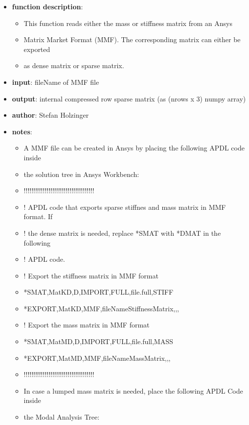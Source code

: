 \begin{itemize}[leftmargin=1.4cm]
\begin{itemize}[leftmargin=1.4cm]
\begin{itemize}[leftmargin=1.4cm]
\begin{itemize}[leftmargin=0.5cm]
\begin{itemize}[leftmargin=1.4cm]
\begin{itemize}[leftmargin=1.4cm]
\begin{itemize}[leftmargin=1.4cm]
\begin{itemize}[leftmargin=0.5cm]
\begin{itemize}[leftmargin=0.7cm]
\item[--]
{\bf function description}: \vspace{-6pt}
\begin{itemize}[leftmargin=1.2cm]
\setlength{\itemindent}{-0.7cm}
\item[]This function reads either the mass or stiffness matrix from an Ansys
\item[]Matrix Market Format (MMF). The corresponding matrix can either be exported
\item[]as dense matrix or sparse matrix.
\end{itemize}
\item[--]
{\bf input}: fileName of MMF file
\item[--]
{\bf output}: internal compressed row sparse matrix (as (nrows x 3) numpy array)
\item[--]
{\bf author}: Stefan Holzinger
\item[--]
{\bf notes}: \vspace{-6pt}
\begin{itemize}[leftmargin=1.2cm]
\setlength{\itemindent}{-0.7cm}
\item[]A MMF file can be created in Ansys by placing the following APDL code inside
\item[]the solution tree in Ansys Workbench:
\item[]!!!!!!!!!!!!!!!!!!!!!!!!!!!!!!!!!!!!!
\item[]! APDL code that exports sparse stiffnes and mass matrix in MMF format. If
\item[]! the dense matrix is needed, replace *SMAT with *DMAT in the following
\item[]! APDL code.
\item[]! Export the stiffness matrix in MMF format
\item[]*SMAT,MatKD,D,IMPORT,FULL,file.full,STIFF
\item[]*EXPORT,MatKD,MMF,fileNameStiffnessMatrix,,,
\item[]! Export the mass matrix in MMF format
\item[]*SMAT,MatMD,D,IMPORT,FULL,file.full,MASS
\item[]*EXPORT,MatMD,MMF,fileNameMassMatrix,,,
\item[]!!!!!!!!!!!!!!!!!!!!!!!!!!!!!!!!!!!!!
\item[]In case a lumped mass matrix is needed, place the following APDL Code inside
\item[]the Modal Analysis Tree:

\end{itemize}
\end{itemize}
\end{itemize}
\end{itemize}
\end{itemize}
\end{itemize}
\end{itemize}
\end{itemize}
\end{itemize}
\end{itemize}
